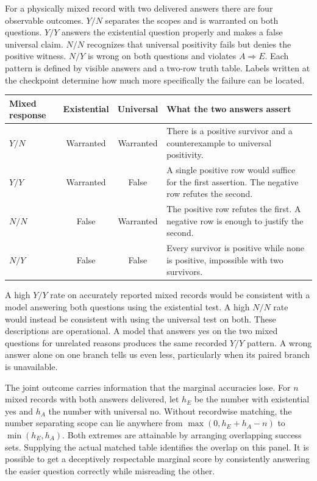 \documentclass[12pt,letterpaper]{article}
\begin{document}
For a physically mixed record with two delivered answers there are four observable outcomes. $Y/N$ separates the scopes and is warranted on both questions. $Y/Y$ answers the existential question properly and makes a false universal claim. $N/N$ recognizes that universal positivity fails but denies the positive witness. $N/Y$ is wrong on both questions and violates $A\Rightarrow E$. Each pattern is defined by visible answers and a two-row truth table. Labels written at the checkpoint determine how much more specifically the failure can be located.

\begin{center}\small\begin{tabularx}{\linewidth}{@{}lccY@{}}\toprule
Mixed response & Existential & Universal & What the two answers assert\\\midrule
$Y/N$ & Warranted & Warranted & There is a positive survivor and a counterexample to universal positivity.\\
$Y/Y$ & Warranted & False & A single positive row would suffice for the first assertion. The negative row refutes the second.\\
$N/N$ & False & Warranted & The positive row refutes the first. A negative row is enough to justify the second.\\
$N/Y$ & False & False & Every survivor is positive while none is positive, impossible with two survivors.\\\bottomrule
\end{tabularx}\end{center}

A high $Y/Y$ rate on accurately reported mixed records would be consistent with a model answering both questions using the existential test. A high $N/N$ rate would instead be consistent with using the universal test on both. These descriptions are operational. A model that answers yes on the two mixed questions for unrelated reasons produces the same recorded $Y/Y$ pattern. A wrong answer alone on one branch tells us even less, particularly when its paired branch is unavailable.

The joint outcome carries information that the marginal accuracies lose. For $n$ mixed records with both answers delivered, let $h_E$ be the number with existential yes and $h_A$ the number with universal no. Without recordwise matching, the number separating scope can lie anywhere from $\max(0,h_E+h_A-n)$ to $\min(h_E,h_A)$. Both extremes are attainable by arranging overlapping success sets. Supplying the actual matched table identifies the overlap on this panel. It is possible to get a deceptively respectable marginal score by consistently answering the easier question correctly while misreading the other.
\end{document}
